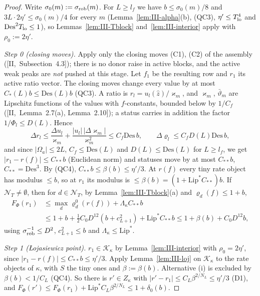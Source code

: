 \documentclass[10pt]{amsart}
\theoremstyle{definition}
\theoremstyle{remark}
\newcommand{\zh}{\hat z}
\begin{document}
\begin{proof}
Write $\sigma_0(m):=\sigma_{\rm rob}(m)$.  For $L\ge l_f$ we have
$b\le\sigma_0(m)/8$ and $3L\cdot2\eta'\le\sigma_0(m)/4$ for every $m$
(Lemma~\ref{lem:III-alpha}(b), (QC3), $\eta'\le T_{\rm lo}^4$ and
$\mathrm{Des}^2T_{\rm lo}\le1$), so Lemmas~\ref{lem:III-Tblock}
and~\ref{lem:III-interior} apply with $\rho_0:=2\eta'$.

\emph{Step 0 (closing moves).}  Apply only the closing moves (C1), (C2) of the
assembly ([II,~Subsection~4.3]); there is no donor raise in active blocks,
and the active weak peaks are \emph{not} pushed at this stage.  Let $f_1$ be
the resulting row and $r_1$ its active ratio vector.  The closing moves
change every value by at most $C_*(L)b\le\mathrm{Des}(L)b$ (QC3).  A ratio is
$r_l=u_l(\zh)/\varkappa_m$, and $\varkappa_m$, $\bar\vartheta_m$ are Lipschitz
functions of the values with $f$-constants, bounded below by $1/C_f$
([II,~Lemma~2.7(a), Lemma~2.10]); a status carries in addition the factor
$1/\Phi_l\le D(L)$.  Hence
\[
 \Delta r_l\le\frac{\Delta u_l}{\varkappa_m}+\frac{|u_l|\,|\Delta\varkappa_m|}
 {\varkappa_m^2}\le C_f\mathrm{Des}\,b,\qquad\Delta\varrho_l\le C_fD(L)
 \mathrm{Des}\,b ,
\]
and since $|\Omega_a|\le2L$, $C_f\le\mathrm{Des}(L)$ and $D(L)\le\mathrm{Des}(L)$
for $L\ge l_f$, we get $|r_1-r(f)|\le C_{**}b$ (Euclidean norm) and statuses
move by at most $C_{**}b$, $C_{**}=\mathrm{Des}^3$.  By (QC4),
$C_{**}b\le\beta(b)\le\eta'/3$.  At $r(f)$ every tiny rate object has
modulus $\le b$, so at $r_1$ its modulus is $\le\beta(b)=(1+\mathrm{Lip}^*C_{**})b$.  If
$\mathcal N_T\ne\emptyset$, then for $d\in\mathcal N_T$, by
Lemma~\ref{lem:III-Tblock}(a) and $\varrho_d(f)\le1+b$,
\[
 \begin{aligned}
 F_\Phi(r_1)&\le\max_d\varrho^0_d(r(f))+\Lambda_\kappa C_{**}b\\
 &\le1+b+\tfrac12C_0D^{12}(b+c_{L+1}^2)+\mathrm{Lip}^*C_{**}b\le1+\beta(b)+
 C_0D^{12}b ,
 \end{aligned}
\]
using $\sigma_{\rm rob}^{-1}\le D^2$, $c_{L+1}^2\le b$ and $\Lambda_\kappa\le
\mathrm{Lip}^*$.

\emph{Step 1 ({\L}ojasiewicz point).}  $r_1\in\mathcal K_\kappa$ by
Lemma~\ref{lem:III-interior} with $\rho_0=2\eta'$, since $|r_1-r(f)|\le
C_{**}b\le\eta'/3$.  Apply Lemma~\ref{lem:III-loj} on $\mathcal
K_\kappa$ to the rate objects of $\kappa$, with $S$ the tiny ones and $\beta:=
\beta(b)$.  Alternative (i) is excluded by $\beta(b)<1/C_L$ (QC4).  So there is
$r'\in Z_\kappa$ with $|r'-r_1|\le C_L\beta^{2/N_L}\le\eta'/3$ (D1), and
$F_\Phi(r')\le F_\Phi(r_1)+\mathrm{Lip}^*C_L\beta^{2/N_L}\le1+\delta_0(b)$.


\end{proof}
\end{document}
